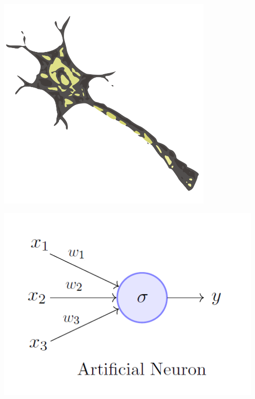 \documentclass[aspectratio=169,usenames,dvipsnames]{beamer}
\begin{document}
\begin{frame}
\begin{minipage}{0.48\textwidth}
\begin{center}
\includegraphics[width=0.8\textwidth, keepaspectratio]{images/neuron} 
\end{center}
\end{minipage}\pause\begin{minipage}{0.48\textwidth}
\begin{center}
\includegraphics[width=0.99\textwidth, keepaspectratio]{images/perceptron} 
\end{center}
\end{minipage}
\end{frame}
\end{document}
